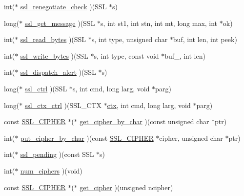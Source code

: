 \begin{DoxyCompactItemize}
\item 
int($\ast$ \hyperlink{structssl__method__st_a88a73e9ebda59498197eb0e6d971d099}{ssl\-\_\-renegotiate\-\_\-check} )(S\-S\-L $\ast$s)
\item 
long($\ast$ \hyperlink{structssl__method__st_abc7d388378f3f61658ba3cb2ff8d493f}{ssl\-\_\-get\-\_\-message} )(S\-S\-L $\ast$s, int st1, int stn, int mt, long max, int $\ast$ok)
\item 
int($\ast$ \hyperlink{structssl__method__st_a8dd5a534ea9770a3fcf2ea91ce8b30d1}{ssl\-\_\-read\-\_\-bytes} )(S\-S\-L $\ast$s, int type, unsigned char $\ast$buf, int len, int peek)
\item 
int($\ast$ \hyperlink{structssl__method__st_afe0ec27b4cecc8692e915dfe403e70a4}{ssl\-\_\-write\-\_\-bytes} )(S\-S\-L $\ast$s, int type, const void $\ast$buf\-\_\-, int len)
\item 
int($\ast$ \hyperlink{structssl__method__st_a9edf0cd5d4d18f3a0ac0250324c3cea1}{ssl\-\_\-dispatch\-\_\-alert} )(S\-S\-L $\ast$s)
\item 
long($\ast$ \hyperlink{structssl__method__st_a05895fdcc347e26857903f4e9ab1fd30}{ssl\-\_\-ctrl} )(S\-S\-L $\ast$s, int cmd, long larg, void $\ast$parg)
\item 
long($\ast$ \hyperlink{structssl__method__st_a61f10fd3d5215c108d31e750f48d9ec6}{ssl\-\_\-ctx\-\_\-ctrl} )(S\-S\-L\-\_\-\-C\-T\-X $\ast$\hyperlink{client_8c_ad5433bcc8a463fb4df3ce5912bb11fe3}{ctx}, int cmd, long larg, void $\ast$parg)
\item 
const \hyperlink{ssl_8h_a548d7a5d565a9e0e9bd45c49f8c95701}{S\-S\-L\-\_\-\-C\-I\-P\-H\-E\-R} $\ast$($\ast$ \hyperlink{structssl__method__st_a7f33bc7f66f8af52e626c154be7795f7}{get\-\_\-cipher\-\_\-by\-\_\-char} )(const unsigned char $\ast$ptr)
\item 
int($\ast$ \hyperlink{structssl__method__st_adbb1a7591225577ffe6996267c5e2a9f}{put\-\_\-cipher\-\_\-by\-\_\-char} )(const \hyperlink{ssl_8h_a548d7a5d565a9e0e9bd45c49f8c95701}{S\-S\-L\-\_\-\-C\-I\-P\-H\-E\-R} $\ast$cipher, unsigned char $\ast$ptr)
\item 
int($\ast$ \hyperlink{structssl__method__st_a94feb7703c74de9cdbe49d2b2772d97e}{ssl\-\_\-pending} )(const S\-S\-L $\ast$s)
\item 
int($\ast$ \hyperlink{structssl__method__st_ac94952d064203e9f6953b0cda68c93b7}{num\-\_\-ciphers} )(void)
\item 
const \hyperlink{ssl_8h_a548d7a5d565a9e0e9bd45c49f8c95701}{S\-S\-L\-\_\-\-C\-I\-P\-H\-E\-R} $\ast$($\ast$ \hyperlink{structssl__method__st_a4ff7b9c1ea43e3b94ad40e7ad9ff80f2}{get\-\_\-cipher} )(unsigned ncipher)

\end{DoxyCompactItemize}
